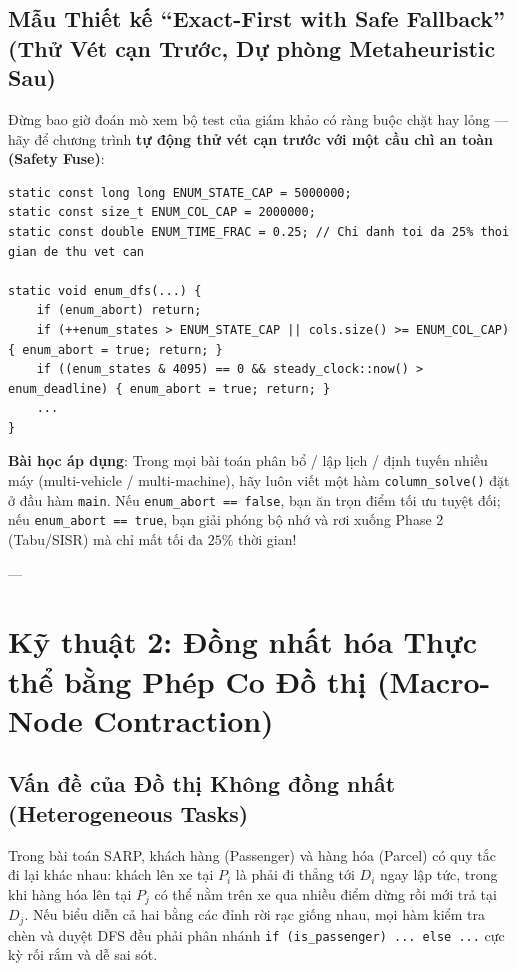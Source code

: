 \documentclass[11pt,a4paper]{article}
\begin{document}
\subsection{Mẫu Thiết kế ``Exact-First with Safe Fallback'' (Thử Vét cạn Trước, Dự phòng Metaheuristic Sau)}
Đừng bao giờ đoán mò xem bộ test của giám khảo có ràng buộc chặt hay lỏng --- hãy để chương trình \textbf{tự động thử vét cạn trước với một cầu chì an toàn (Safety Fuse)}:
\begin{lstlisting}
static const long long ENUM_STATE_CAP = 5000000;
static const size_t ENUM_COL_CAP = 2000000;
static const double ENUM_TIME_FRAC = 0.25; // Chi danh toi da 25% thoi gian de thu vet can

static void enum_dfs(...) {
    if (enum_abort) return;
    if (++enum_states > ENUM_STATE_CAP || cols.size() >= ENUM_COL_CAP) { enum_abort = true; return; }
    if ((enum_states & 4095) == 0 && steady_clock::now() > enum_deadline) { enum_abort = true; return; }
    ...
}
\end{lstlisting}
\textbf{Bài học áp dụng}: Trong mọi bài toán phân bổ / lập lịch / định tuyến nhiều máy (multi-vehicle / multi-machine), hãy luôn viết một hàm \texttt{column\_solve()} đặt ở đầu hàm \texttt{main}. Nếu \texttt{enum\_abort == false}, bạn ăn trọn điểm tối ưu tuyệt đối; nếu \texttt{enum\_abort == true}, bạn giải phóng bộ nhớ và rơi xuống Phase 2 (Tabu/SISR) mà chỉ mất tối đa $25\%$ thời gian!

---

\section{Kỹ thuật 2: Đồng nhất hóa Thực thể bằng Phép Co Đồ thị (Macro-Node Contraction)}

\subsection{Vấn đề của Đồ thị Không đồng nhất (Heterogeneous Tasks)}
Trong bài toán SARP, khách hàng (Passenger) và hàng hóa (Parcel) có quy tắc đi lại khác nhau: khách lên xe tại $P_i$ là phải đi thẳng tới $D_i$ ngay lập tức, trong khi hàng hóa lên tại $P_j$ có thể nằm trên xe qua nhiều điểm dừng rồi mới trả tại $D_j$. Nếu biểu diễn cả hai bằng các đỉnh rời rạc giống nhau, mọi hàm kiểm tra chèn và duyệt DFS đều phải phân nhánh \texttt{if (is\_passenger) ... else ...} cực kỳ rối rắm và dễ sai sót.
\end{document}
